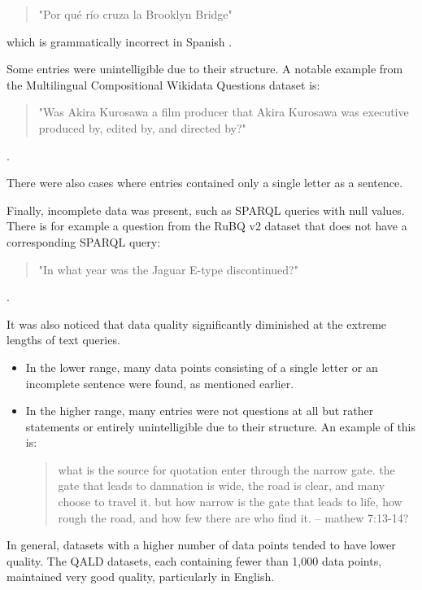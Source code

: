 \begin{quote}
"Por qué río cruza la Brooklyn Bridge"
\end{quote}

which is grammatically incorrect in Spanish \cite{10.1007/978-3-642-40802-1_30}.

Some entries were unintelligible due to their structure. A notable example from the Multilingual Compositional Wikidata Questions dataset is:

\begin{quote}
"Was Akira Kurosawa a film producer that Akira Kurosawa was executive produced by, edited by, and directed by?"
\end{quote}

\cite{2021arXiv210803509C}.

There were also cases where entries contained only a single letter as a sentence.

Finally, incomplete data was present, such as SPARQL queries with null values. There is for example a question from the RuBQ v2 dataset that does not have a corresponding SPARQL query:
\begin{quote}
"In what year was the Jaguar E-type discontinued?"
\end{quote}

\cite{rybin2021rubq}.

It was also noticed that data quality significantly diminished at the extreme lengths of text queries.
\begin{itemize}
    \item In the lower range, many data points consisting of a single letter or an incomplete sentence were found, as mentioned earlier.
    \item In the higher range, many entries were not questions at all but rather statements or entirely unintelligible due to their structure. An example of this is:
    \begin{quote}
    what is the source for quotation enter through the narrow gate. the gate that leads to damnation is wide, the road is clear, and many choose to travel it. but how narrow is the gate that leads to life, how rough the road, and how few there are who find it. -- mathew 7:13-14?
    \end{quote}
\end{itemize}

In general, datasets with a higher number of data points tended to have lower quality. The QALD datasets, each containing fewer than 1,000 data points, maintained very good quality, particularly in English.

